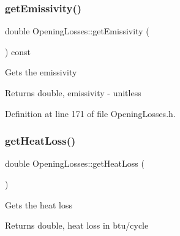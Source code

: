 \mbox{\label{class_opening_losses_a7eaf8e68f268e8ff1671c5f9f0462b4f}} 
\subsubsection{\texorpdfstring{get\+Emissivity()}{getEmissivity()}\hspace{0.1cm}{\footnotesize\ttfamily [3/3]}}
{\footnotesize\ttfamily double Opening\+Losses\+::get\+Emissivity (\begin{DoxyParamCaption}{ }\end{DoxyParamCaption}) const\hspace{0.3cm}{\ttfamily [inline]}}

Gets the emissivity

\begin{DoxyReturn}{Returns}
double, emissivity -\/ unitless 
\end{DoxyReturn}


Definition at line 171 of file Opening\+Losses.\+h.

\mbox{\label{class_opening_losses_a38112eb408f72e252b42a68a41a25d0f}} 
\subsubsection{\texorpdfstring{get\+Heat\+Loss()}{getHeatLoss()}\hspace{0.1cm}{\footnotesize\ttfamily [1/3]}}
{\footnotesize\ttfamily double Opening\+Losses\+::get\+Heat\+Loss (\begin{DoxyParamCaption}{ }\end{DoxyParamCaption})}

Gets the heat loss

\begin{DoxyReturn}{Returns}
double, heat loss in btu/cycle 
\end{DoxyReturn}
\mbox{\label{class_opening_losses_a38112eb408f72e252b42a68a41a25d0f}} 
